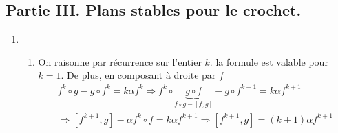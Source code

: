 \subsection*{Partie III. Plans stables pour le crochet.}
\begin{enumerate}
  \item 
\begin{enumerate}
  \item On raisonne par récurrence sur l'entier $k$. la formule est valable pour $k=1$. De plus, en composant à droite par $f$
\begin{multline*}
f^k\circ g - g\circ f^k = k\alpha f^k 
\Rightarrow f^{k}\circ \underset{f\circ g - [f,g]}{\underbrace{g\circ f}} - g\circ f^{k+1} = k\alpha f^{k+1}\\
\Rightarrow [f^{k+1},g] -\alpha f^k \circ f = k \alpha f^{k+1}
\Rightarrow [f^{k+1},g]  = (k+1) \alpha f^{k+1}
\end{multline*}


\end{enumerate}
\end{enumerate}
